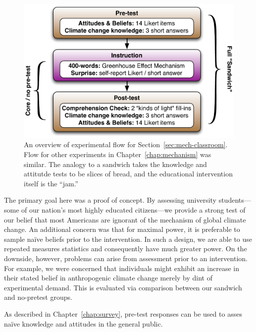 \begin{figure}[h]
    \includegraphics[width=6.5in]{mech-survey-flow1.pdf}
    \caption{An overview of experimental flow for
        Section~\ref{sec:mech-classroom}. Flow for other experiments in
        Chapter~\ref{chap:mechanism} was similar. The analogy to a sandwich
        takes the knowledge and attitutde tests to be slices of bread, and the
        educational intervention itself is the “jam.”}
    \label{fig:mech-flow}
\end{figure}

The primary goal here was a proof of concept. By assessing university
students---some of our nation’s most highly educated citizens---we provide a
strong test of our belief that most Americans are ignorant of the mechanism of
global climate change. An additional concern was that for maximal power, it is
preferable to sample na\"ive beliefs prior to the intervention. In such a
design, we are able to use repeated measures statistics and consequently have
much greater power. On the downside, however, problems can arise from assessment
prior to an intervention. For example, we were concerned that individuals might
exhibit an increase in their stated belief in anthropogenic climate change
merely by dint of experimental demand. This is evaluated via comparison between
our sandwich and no-pretest groups.

As described in Chapter~\ref{chap:survey}, pre-test responses can be used to
asses na\"ive knowledge and attitudes in the general public. 


